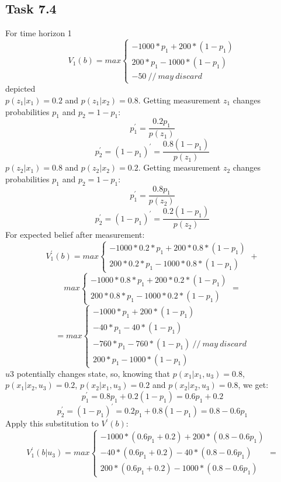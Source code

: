 \documentclass[english]{scrartcl}
\begin{document}
\subsection*{Task 7.4}
For time horizon 1
\[
    V_1(b)=max\left\{
                \begin{array}{ll}
                  -1000*p_1+200*(1-p_1)\\
                  200*p_1-1000*(1-p_1)\\
                  -50 \ // \ may \ discard
                \end{array}
              \right.
  \]
 depicted 
\\$p(z_1|x_1) = 0.2$ and $p(z_1|x_2)=0.8$. Getting measurement $z_1$ changes probabilities $p_1$ and $p_2=1-p_1$:
$$p_1^\prime=\frac{0.2p_1}{p(z_1)}$$
$$p_2^\prime = (1-p_1)^\prime = \frac{0.8(1-p_1)}{p(z_1)}$$
$p(z_2|x_1) = 0.8$ and $p(z_2|x_2)=0.2$. Getting measurement $z_2$ changes probabilities $p_1$ and $p_2=1-p_1$:
$$p_1^\prime=\frac{0.8p_1}{p(z_2)}$$
$$p_2^\prime = (1-p_1)^\prime = \frac{0.2(1-p_1)}{p(z_2)}$$
For expected belief after measurement:
\[
    V_1^\prime(b)=max\left\{
                \begin{array}{ll}
                  -1000*0.2*p_1+200*0.8*(1-p_1)\\
                  200*0.2*p_1-1000*0.8*(1-p_1)
                \end{array}
              \right. + 
  \]
  \[
              max\left\{
                \begin{array}{ll}
                  -1000*0.8*p_1+200*0.2*(1-p_1)\\
                  200*0.8*p_1-1000*0.2*(1-p_1)
                \end{array}
              \right. = 
  \]
  \[
     =max\left\{
                \begin{array}{ll}
                  -1000*p_1+200*(1-p_1)\\
                  -40*p_1-40*(1-p_1)\\
                  -760*p_1-760*(1-p_1) \ // \ may \ discard\\
                  200*p_1-1000*(1-p_1)
                \end{array}
              \right.
  \]
$u3$ potentially changes state, so, knowing that $p(x_1|x_1,u_3)=0.8$, $p(x_1|x_2,u_3)=0.2$, $p(x_2|x_1,u_3)=0.2$ and $p(x_2|x_2,u_3)=0.8$, we get:
$$p_1^\prime=0.8p_1+0.2(1-p_1)=0.6p_1+0.2$$
$$p_2^\prime=(1-p_1)^\prime=0.2p_1+0.8(1-p_1)=0.8-0.6p_1$$
Apply this substitution to $V^\prime(b)$:
\[
     V_1^\prime(b|u_3)=max\left\{
                \begin{array}{ll}
                  -1000*(0.6p_1+0.2)+200*(0.8-0.6p_1)\\
                  -40*(0.6p_1+0.2)-40*(0.8-0.6p_1)\\
                  200*(0.6p_1+0.2)-1000*(0.8-0.6p_1)
                \end{array}
              \right.=
  \]
\end{document}
